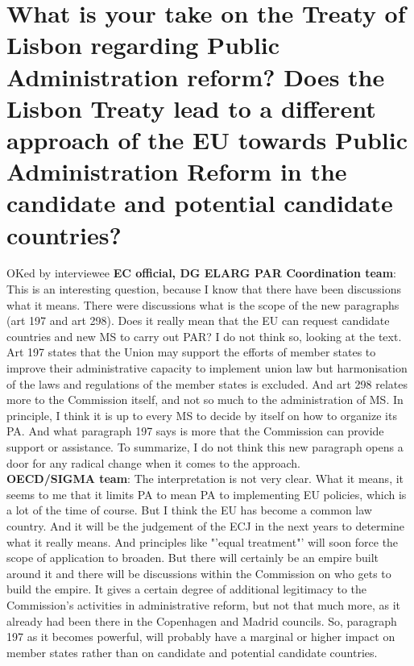 \section{What is your take on the Treaty of Lisbon regarding Public Administration reform? Does the Lisbon Treaty lead to a different approach of the EU towards Public Administration Reform in the candidate and potential candidate countries?}
\label{sec:countries1}
OKed by interviewee
\textbf{EC official, DG ELARG PAR Coordination team}: This is an interesting question, because I know that there have been discussions what it means. There were discussions what is the scope of the new paragraphs (art 197 and art 298). Does it really mean that the EU can request candidate countries and new MS to carry out PAR? I do not think so, looking at the text. Art 197 states that the Union may support the efforts of member states to improve their administrative capacity to implement union law but harmonisation of the laws and regulations of the member states is excluded. And art 298 relates more to the Commission itself, and not so much to the administration of MS. In principle, I think it is up to every MS to decide by itself on how to organize its PA. And what paragraph 197 says is more that the Commission can provide support or assistance. To summarize, I do not think this new paragraph opens a door for any radical change when it comes to the approach. \\
\textbf{OECD/SIGMA team}: The interpretation is not very clear. What it means, it seems to me that it limits PA to mean PA to implementing EU policies, which is a lot of the time of course. But I think the EU has become a common law country. And it will be the judgement of the ECJ in the next years to determine what it really means. And principles like "'equal treatment"' will soon force the scope of application to broaden. But there will certainly be an empire built around it and there will be discussions within the Commission on who gets to build the empire. It gives a certain degree of additional legitimacy to the Commission's activities in administrative reform, but not that much more, as it already had been there in the Copenhagen and Madrid councils. So, paragraph 197 as it becomes powerful, will probably have a marginal or higher impact on member states rather than on candidate and potential candidate countries.\\
